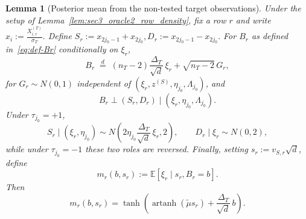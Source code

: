 \documentclass[10pt]{article}
\newtheorem{lemma}{Lemma}
\newcommand{\Ebb}{\mathbb E}
\newcommand{\trg}{T}
\newcommand{\nT}{n_{\trg}}
\newcommand{\sigmaT}{\sigma_{\trg}}
\newcommand{\DeltaT}{\Delta_{\trg}}
\newcommand{\src}{S}
\newcommand{\zsrc}{z^{(\src)}}
\begin{document}
\begin{lemma}[Posterior mean from the non-tested target observations]
\label{lem:sec3_oracle2_posterior}
Under the setup of Lemma~\ref{lem:sec3_oracle2_row_density}, fix a row $r$ and
write
$
    x_i:=\frac{X^{(T)}_{i,r}}{\sigmaT}.
$
Define
$
    S_r:=x_{2j_0-1}+x_{2j_0},
      D_r:=x_{2j_0-1}-x_{2j_0}.
$
For $B_r$ as defined in~\eqref{eq:def-Br} conditionally on $\xi_r$,
\[
    B_r
    \;\overset{d}{=}\;
    (\nT-2)\frac{\DeltaT}{\sqrt d}\,\xi_r+\sqrt{\nT-2}\,G_r,
\]
for $G_r\sim N(0,1)$ independent of $(\xi_r,\zsrc,\eta_{j_0},\Lambda_{j_0})$, and
\begin{equation}
\label{eq:sec3_independence_B_SD}
    B_r \perp (S_r,D_r) \mid (\xi_r,\eta_{j_0},\Lambda_{j_0}).
\end{equation}
Under $\tau_{j_0}=+1$,
\[
    S_r\mid (\xi_r,\eta_{j_0}) \sim N\!\left(2\eta_{j_0}\frac{\DeltaT}{\sqrt d}\,\xi_r,2\right),
    \qquad
    D_r\mid \xi_r \sim N(0,2),
\]
while under $\tau_{j_0}=-1$ these two roles are reversed. Finally, setting
$s_r:=v_{\src,r}\sqrt{d}$, define
\[
    m_r(b,s_r):=\Ebb[\xi_r\mid s_r,B_r=b].
\]
Then
\begin{equation}
\label{eq:sec3_oracle2_posterior_mean}
    m_r(b,s_r)
    =
    \tanh\!\left(
        \operatorname{artanh}(\tilde\mu s_r)+\frac{\DeltaT}{\sqrt d}\,b
    \right).
\end{equation}
\end{lemma}
\end{document}
